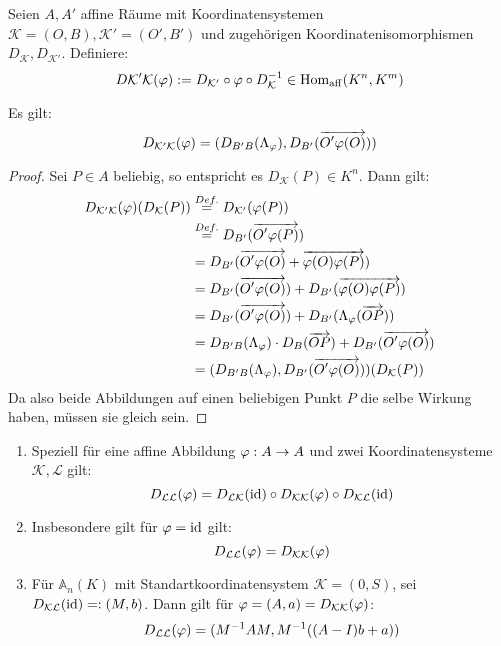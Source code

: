 \documentclass[parskip,a4paper,twoside,DIV15,BCOR12mm]{scrbook}
\begin{document}
\begin{definition}
Seien $A,A'$ affine Räume mit Koordinatensystemen $\mathcal{K}=(O,B),\mathcal{K'}=(O',B')$
und zugehörigen Koordinatenisomorphismen $D_{\mathcal{K}},D_{\mathcal{K'}}$. Definiere:
\[D{\mathcal{K'K}}(\varphi):=D_{\mathcal{K'}}\circ \varphi\circ D_{\mathcal{K}}^{-1}\in\operatorname{Hom_{aff}}(K^n,K^m)\]
\end{definition}

\begin{lemma}
Es gilt:
\[D_{\mathcal{K'K}}(\varphi)=(D_{B'B}(\Lambda_\varphi),D_{B'}(\overrightarrow{O'\varphi(O)}))\]
\end{lemma}

\begin{proof}
Sei $P\in A$ beliebig, so entspricht es $D_\mathcal{K}(P)\in K^n$. Dann gilt:
\begin{align*}
D_{\mathcal{K'K}}(\varphi)(D_\mathcal{K}(P)) &\stackrel{Def.}{=} D_\mathcal{K'}(\varphi(P))\\
&\stackrel{Def.}{=} D_{B'}(\overrightarrow{O'\varphi(P)})\\
&= D_{B'}(\overrightarrow{O'\varphi(O)}+\overrightarrow{\varphi(O)\varphi(P)})\\
&= D_{B'}(\overrightarrow{O'\varphi(O)})+D_{B'}(\overrightarrow{\varphi(O)\varphi(P)})\\
&= D_{B'}(\overrightarrow{O'\varphi(O)})+D_{B'}(\Lambda_\varphi (\overrightarrow{OP}))\\
&= D_{B'B}(\Lambda_\varphi)\cdot D_B(\overrightarrow{OP})+D_{B'}(\overrightarrow{O'\varphi(O)})\\
&= (D_{B'B}(\Lambda_\varphi),D_{B'}(\overrightarrow{O'\varphi(O)}))(D_\mathcal{K}(P))
\end{align*}
Da also beide Abbildungen auf einen beliebigen Punkt $P$ die selbe Wirkung haben, 
müssen sie gleich sein.
\end{proof}

\begin{comment}
Das Zusammenfügen von kommutativen Diagrammen liefert für einen weiteren affinen Raum
$A''$ mit Koordinatensystem $\mathcal{K''}=(O'',B'')$ und einer affinen Abbildung $\Psi:
A'\to A''$:
\[D_{\mathcal{K''K}}(\psi\circ\vp)=D_{\mathcal{K''K'}}(\psi)\circ D_{\mathcal{K'K}}(\vp)\]
\end{comment}

\begin{corollary}
\begin{enumerate}
\item Speziell für eine affine Abbildung $\varphi:A\to A$ und zwei Koordinatensysteme
$\mathcal{K,L}$ gilt:
\[D_{\mathcal{LL}}(\varphi)=D_{\mathcal{LK}}(\operatorname{id})\circ D_{\mathcal{KK}}(\varphi)\circ D_{\mathcal{KL}}(\operatorname{id})\]
\item Insbesondere gilt für $\varphi=\operatorname{id}$ gilt:
\[D_{\mathcal{LL}}(\varphi)=D_{\mathcal{KK}}(\varphi)\]
\item Für $\mathbb{A}_n(K)$ mit Standartkoordinatensystem $\mathcal{K}=(0,S)$, sei
$D_{\mathcal{KL}}(\operatorname{id})=:(M,b)$. Dann gilt für $\varphi=(A,a)=D_{\mathcal{KK}}(\varphi)$:
\[D_{\mathcal{LL}}(\varphi)=(M^{-1}AM,M^{-1}((A-I)b+a))\]
\end{enumerate}
\end{corollary}
\end{document}
